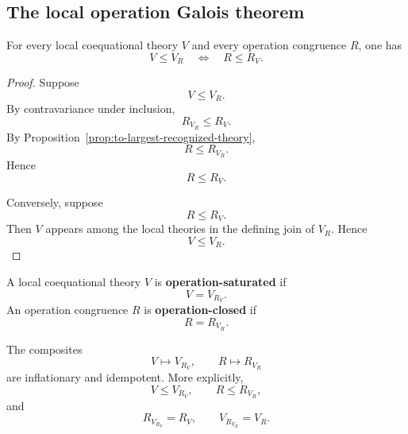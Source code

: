 \subsection{The local operation Galois theorem}
\label{subsec:to-local-operation-galois}

\begin{theorem}
\label{thm:to-local-operation-galois}
    For every local coequational theory \(V\) and every operation congruence
    \(R\), one has
    \[
        V\leq V_R
        \quad\Longleftrightarrow\quad
        R\leq R_V.
    \]
\end{theorem}

\begin{proof}
    Suppose
    \[
        V\leq V_R.
    \]
    By contravariance under inclusion,
    \[
        R_{V_R}\leq R_V.
    \]
    By Proposition~\ref{prop:to-largest-recognized-theory},
    \[
        R\leq R_{V_R}.
    \]
    Hence
    \[
        R\leq R_V.
    \]

    Conversely, suppose
    \[
        R\leq R_V.
    \]
    Then \(V\) appears among the local theories in the defining join of
    \(V_R\). Hence
    \[
        V\leq V_R.
    \]
\end{proof}

\begin{definition}
\label{def:to-operation-saturated-and-closed}
    A local coequational theory \(V\) is \textbf{operation-saturated} if
    \[
        V=V_{R_V}.
    \]
    An operation congruence \(R\) is \textbf{operation-closed} if
    \[
        R=R_{V_R}.
    \]
\end{definition}

\begin{lemma}
\label{lem:to-operation-closure-operators}
    The composites
    \[
        V\longmapsto V_{R_V},
        \qquad
        R\longmapsto R_{V_R}
    \]
    are inflationary and idempotent. More explicitly,
    \[
        V\leq V_{R_V},
        \qquad
        R\leq R_{V_R},
    \]
    and
    \[
        R_{V_{R_V}}=R_V,
        \qquad
        V_{R_{V_R}}=V_R.
    \]
\end{lemma}

